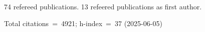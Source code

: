 74 refereed publications. 13 refeered publications as first author.

Total citations~=~4921; h-index~=~37 (2025-06-05)